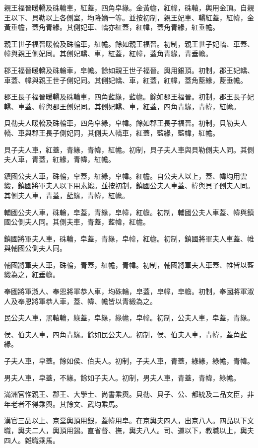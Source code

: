 \begin{pinyinscope}
親王福晉暖轎及硃輪車，紅蓋，四角皁緣。金黃幨，紅幃，硃轅，輿用金頂。自親王以下、貝勒以上各側室，均降嫡一等。並按初制，親王妃車、轎紅蓋，紅幃，金黃垂幨，蓋角青緣。其側妃車、轎亦紅蓋，紅幃，蓋角青緣，紅垂幨。

親王世子福晉暖轎及硃輪車，紅幨。餘如親王福晉。初制，親王世子妃轎、車蓋、幃與親王側妃同。其側妃轎、車，紅蓋，紅幃，蓋角青緣，青垂幨。

郡王福晉暖轎及硃輪車，皁幨。餘如親王世子福晉。輿用銀頂。初制，郡王妃轎、車蓋、幃與親王世子側妃同。其側妃轎、車，紅蓋，紅幃，蓋角藍緣，藍垂幨。

郡王長子福晉暖轎及硃輪車，四角藍緣，藍幨。餘如郡王福晉。初制，郡王長子妃轎、車蓋、幃與郡王側妃同。其側妃轎、車，紅蓋，四角青緣，青幃，紅幨。

貝勒夫人暖轎及硃輪車，四角皁緣，皁幃。餘如郡王長子福晉。初制，貝勒夫人轎、車與郡王長子側妃同，其側夫人轎車，紅蓋，藍緣，藍幃，紅幨。

貝子夫人車，紅蓋，青緣，青幃，紅幨。初制，貝子夫人車與貝勒側夫人同。其側夫人車，青蓋，紅緣，青幃，紅幨。

鎮國公夫人車，硃輪，皁蓋，紅緣，皁幃。紅幨。自公夫人以上，蓋、幃均用雲緞，鎮國將軍夫人以下用素緞。並按初制，鎮國公夫人車蓋、幃與貝子側夫人同。其側夫人車，青蓋，藍緣，青幃，紅幨。

輔國公夫人車，硃輪，皁蓋，青緣，皁幃，紅幨。初制，輔國公夫人車蓋、幃與鎮國公側夫人同。其側夫車，青蓋，藍幃，紅幨。

鎮國將軍夫人車，硃輪，皁蓋，青緣，皁幃，紅幨。初制，鎮國將軍夫人車蓋、帷與輔國公側夫人同。

輔國將軍夫人車，硃輪，青蓋，紅幨，青幃。初制，輔國將軍夫人車蓋、帷皆以藍緞為之，紅垂幨。

奉國將軍淑人、奉恩將軍恭人車，均硃輪，皁蓋，皁幃，皁幨。初制，奉國將軍淑人及奉恩將軍恭人車，蓋、幃、幨皆以青緞為之。

民公夫人車，黑轅輪，綠蓋，皁緣，綠幨，皁幃。初制，公夫人車，皁蓋，青緣。

侯、伯夫人車，四角青緣。餘如民公夫人。初制，侯、伯夫人車，青幃，蓋角藍緣。

子夫人車，皁蓋。餘如侯、伯夫人。初制，子夫人車，青蓋，綠緣，綠幨，青幃。

男夫人車，皁蓋，不緣。餘如子夫人。初制，男夫人車，青蓋，青幃，綠幨。

滿洲官惟親王、郡王、大學士、尚書乘輿。貝勒、貝子、公、都統及二品文臣，非年老者不得乘輿。其餘文、武均乘馬。

漢官三品以上、京堂輿頂用銀，蓋幃用皁。在京輿夫四人，出京八人。四品以下文職，輿夫二人，輿頂用錫。直省督、撫，輿夫八人。司、道以下，教職以上，輿夫四人。雜職乘馬。


\end{pinyinscope}
